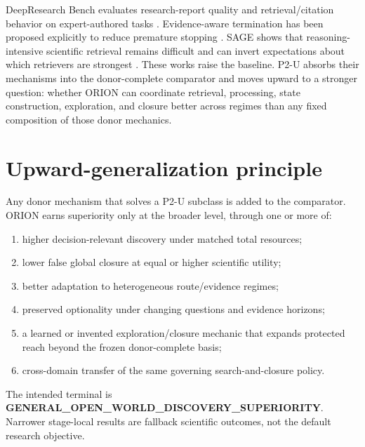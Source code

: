 \documentclass[11pt]{article}
\begin{document}
DeepResearch Bench evaluates research-report quality and retrieval/citation behavior on expert-authored tasks \cite{deepresearchbench2026}. Evidence-aware termination has been proposed explicitly to reduce premature stopping \cite{dontstopearly2026}. SAGE shows that reasoning-intensive scientific retrieval remains difficult and can invert expectations about which retrievers are strongest \cite{sage2026}. These works raise the baseline. P2-U absorbs their mechanisms into the donor-complete comparator and moves upward to a stronger question: whether ORION can coordinate retrieval, processing, state construction, exploration, and closure better across regimes than any fixed composition of those donor mechanics.

\section{Upward-generalization principle}
Any donor mechanism that solves a P2-U subclass is added to the comparator. ORION earns superiority only at the broader level, through one or more of:
\begin{enumerate}
    \item higher decision-relevant discovery under matched total resources;
    \item lower false global closure at equal or higher scientific utility;
    \item better adaptation to heterogeneous route/evidence regimes;
    \item preserved optionality under changing questions and evidence horizons;
    \item a learned or invented exploration/closure mechanic that expands protected reach beyond the frozen donor-complete basis;
    \item cross-domain transfer of the same governing search-and-closure policy.
\end{enumerate}
The intended terminal is \textbf{GENERAL_OPEN_WORLD_DISCOVERY_SUPERIORITY}. Narrower stage-local results are fallback scientific outcomes, not the default research objective.
\end{document}
